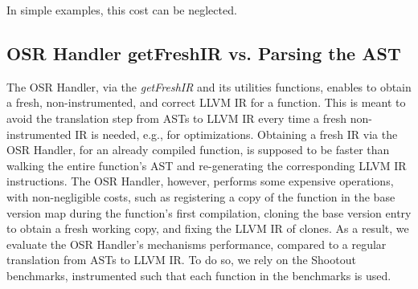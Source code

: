In simple examples, this cost can be neglected.\\ 

\subsection{OSR Handler getFreshIR vs. Parsing the AST}



The OSR Handler, via the \textit{getFreshIR} and its utilities functions, enables to obtain a fresh, non-instrumented, and correct LLVM IR for a function.
This is meant to avoid the translation step from ASTs to LLVM IR every time a fresh non-instrumented IR is needed, e.g., for optimizations.
Obtaining a fresh IR via the OSR Handler, for an already compiled function, is supposed to be faster than walking the entire function's AST and re-generating the corresponding LLVM IR instructions.
The OSR Handler, however, performs some expensive operations, with non-negligible costs, such as registering a copy of the function in the base version map during the function's first compilation, cloning the base version entry to obtain a fresh working copy, and fixing the LLVM IR of clones.
As a result, we evaluate the OSR Handler's mechanisms performance, compared to a regular translation from ASTs to LLVM IR.
To do so, we rely on the Shootout benchmarks\cite{Shootout}, instrumented such that each function in the benchmarks is used.\\

